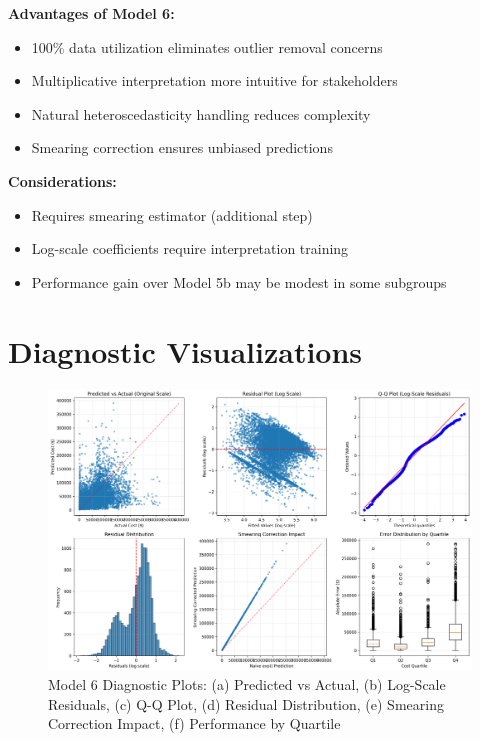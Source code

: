 \textbf{Advantages of Model 6:}
\begin{itemize}
    \item 100\% data utilization eliminates outlier removal concerns
    \item Multiplicative interpretation more intuitive for stakeholders
    \item Natural heteroscedasticity handling reduces complexity
    \item Smearing correction ensures unbiased predictions
\end{itemize}

\textbf{Considerations:}
\begin{itemize}
    \item Requires smearing estimator (additional step)
    \item Log-scale coefficients require interpretation training
    \item Performance gain over Model 5b may be modest in some subgroups
\end{itemize}

\section{Diagnostic Visualizations}

\begin{figure}[h]
    \centering
    \includegraphics[width=\textwidth]{models/model_6/diagnostic_plots.png}
    \caption{Model 6 Diagnostic Plots: (a) Predicted vs Actual, (b) Log-Scale Residuals, (c) Q-Q Plot, (d) Residual Distribution, (e) Smearing Correction Impact, (f) Performance by Quartile}
    \label{fig:model6_diagnostics}
\end{figure}

